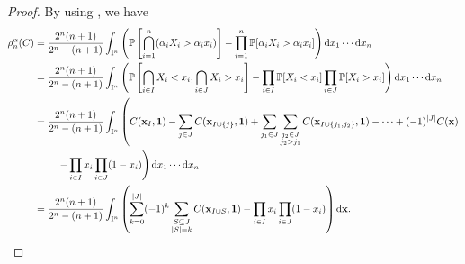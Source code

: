 \documentclass[11pt,a4paper]{article}
\def\xx{{\mathbf x}}
\begin{document}
\begin{proof} By using \cite[Lemma 3.4 and Remark 3.5]{Edeamo}, we have
     \begin{align*}
        \rho_n^\alpha(C)&=\frac{2^n(n+1)}{2^n-(n+1)}\int_{\mathbb{I}^n}\left(\mathbb{P}\left[\bigcap_{i=1}^n(\alpha_iX_i>\alpha_ix_i)\right]-\prod_{i=1}^n\mathbb{P}[\alpha_iX_i>\alpha_ix_i]\right){\rm d}x_1\cdots {\rm d}x_n\\
        &=\frac{2^n(n+1)}{2^n-(n+1)}\int_{\mathbb{I}^n}\left(\mathbb{P}\left[\bigcap_{i\in I}X_i<x_i,\bigcap_{i\in J}X_i>x_i\right]-\prod_{i\in I}\mathbb{P}[X_i<x_i]\prod_{i\in J}\mathbb{P}[X_i>x_i]\right){\rm d}x_1\cdots {\rm d}x_n\\
        &=\frac{2^n(n+1)}{2^n-(n+1)}\int_{\mathbb{I}^n}\left( C(\xx_I,{\bf 1})-\sum_{j\in J}C(\xx_{I\cup\{j\}},{\bf1})+\sum_{j_1\in J}\sum_{\substack{j_2\in J\\ j_2>j_1}}C(\xx_{I\cup\{j_1,j_2\}},{\bf 1})-\cdots+(-1)^{|J|}C(\xx)\right.\\
        &\left.\hspace{0.8cm}-\prod_{i\in I}x_i\prod_{i\in J}(1-x_i)\right){\rm d}x_1\cdots {\rm d}x_n\\
        &=\frac{2^n(n+1)}{2^n-(n+1)}\int_{\mathbb{I}^n}\left( \sum_{k=0}^{|J|} (-1)^k \sum_{\substack{S \subseteq J \\ |S|=k}} C(\mathbf{x}_{I \cup S}, \mathbf{1}) - \prod_{i\in I}x_i\prod_{i\in J}(1-x_i) \right){\rm d}{\bf x}.\\
    \end{align*}

\end{proof}
\end{document}
